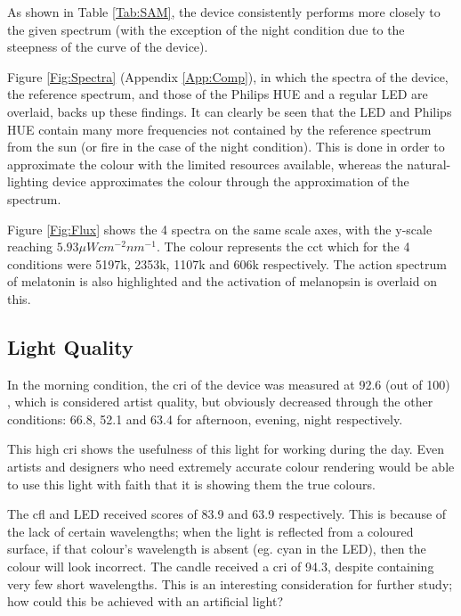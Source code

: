 As shown in Table \ref{Tab:SAM}, the device consistently performs more closely to the given spectrum (with the exception of the \acrshort{night} condition due to the steepness of the curve of the device). 

Figure \ref{Fig:Spectra} (Appendix \ref{App:Comp}), in which the spectra of the device, the reference spectrum, and those of the Philips HUE and a regular LED are overlaid, backs up these findings. It can clearly be seen that the LED and Philips HUE contain many more frequencies not contained by the reference spectrum from the sun (or fire in the case of the \acrshort{night} condition). This is done in order to approximate the colour with the limited resources available, whereas the natural-lighting device approximates the colour through the approximation of the spectrum.

Figure \ref{Fig:Flux} shows the 4 spectra on the same scale axes, with the y-scale reaching $5.93\mu Wcm^{-2}nm^{-1}$. The colour represents the \acrfull{cct} which for the 4 conditions were 5197k, 2353k, 1107k and 606k respectively. The action spectrum of melatonin is also highlighted and the activation of melanopsin is overlaid on this.


\subsection{Light Quality}

In the \acrshort{morning} condition, the \acrshort{cri} of the device was measured at 92.6 (out of 100) , which is considered artist quality, but obviously decreased through the other conditions: 66.8, 52.1 and 63.4 for \acrshort{afternoon}, \acrshort{evening}, \acrshort{night} respectively.

This high \acrshort{cri} shows the usefulness of this light for working during the day. Even artists and designers who need extremely accurate colour rendering would be able to use this light with faith that it is showing them the true colours.
 
The \acrshort{cfl} and LED received scores of 83.9 and 63.9 respectively. This is because of the lack of certain wavelengths; when the light is reflected from a coloured surface, if that colour's wavelength is absent (eg. cyan in the LED), then the colour will look incorrect. The candle received a \acrshort{cri} of 94.3, despite containing very few short wavelengths. This is an interesting consideration for further study; how could this be achieved with an artificial light?

